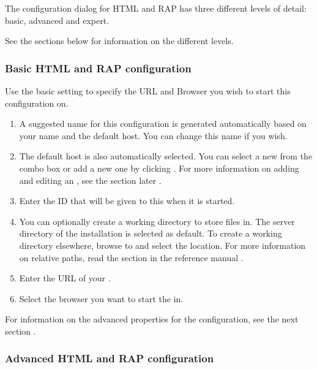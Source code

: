

The \gdaut{} configuration dialog for HTML and RAP has three different levels of detail: basic, advanced and expert. 

See the sections below for information on the different levels. 

\subsubsection{Basic HTML and RAP \gdaut{} configuration}

Use the basic setting to specify the URL and Browser you wish to start this \gdaut{} configuration on. 

\begin{enumerate}
\item A suggested name for this \gdaut{} configuration is generated automatically based on your \gdaut{} name and the default \gdagent{} host. You can change this name if you wish. 
\item The default \gdagent host is also automatically selected. You can select a new \gdagent{} from the combo box or add a new one by clicking . For more information on adding and editing an \gdagent{}, see the section later .
\item Enter the \gdaut{} ID that will be given to this \gdaut{} when it is started.  
\item You can optionally create a working directory to store files in. The server directory of the \app{} installation is selected as default. To create a working directory elsewhere, browse to and select the location.  For more information on relative paths, read the section in the reference manual . 
\item Enter the URL of your \gdaut{}.
\item Select the browser you want to start the \gdaut{} in.
\end{enumerate}
For information on the advanced properties for the \gdaut{} configuration, see the next section . 

\subsubsection{Advanced HTML and RAP \gdaut{} configuration}
\label{AdvancedAUTConfigHTML}

